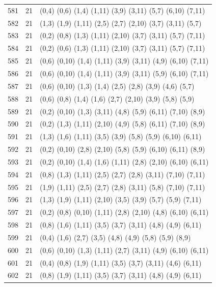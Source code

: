 \begin{appendix}
{\begin{longtable}{lll}
581& 21 & (0,4)   (0,6)  (1,4)  (1,11)  (3,9)   (3,11)  (5,7)   (6,10)  (7,11)\\
582& 21 & (1,3)   (1,9)  (1,11) (2,5)   (2,7)   (2,10)  (3,7)   (3,11)  (5,7)\\
583& 21 & (0,2)   (0,8)  (1,3)  (1,11)  (2,10)  (3,7)   (3,11)  (5,7)   (7,11)\\
584& 21 & (0,2)   (0,6)  (1,3)  (1,11)  (2,10)  (3,7)   (3,11)  (5,7)   (7,11)\\
585& 21 & (0,6)   (0,10) (1,4)  (1,11)  (3,9)   (3,11)  (4,9)   (6,10)  (7,11)\\
586& 21 & (0,6)   (0,10) (1,4)  (1,11)  (3,9)   (3,11)  (5,9)   (6,10)  (7,11)\\
587& 21 & (0,6)   (0,10) (1,3)  (1,4)   (2,5)   (2,8)   (3,9)   (4,6)   (5,7)\\
588& 21 & (0,6)   (0,8)  (1,4)  (1,6)   (2,7)   (2,10)  (3,9)   (5,8)   (5,9)\\
589& 21 & (0,2)   (0,10) (1,3)  (3,11)  (4,8)   (5,9)   (6,11)  (7,10)  (8,9)\\
590& 21 & (0,2)   (1,3)  (1,11) (2,10)  (4,9)   (5,8)   (6,11)  (7,10)  (8,9)\\
591& 21 & (1,3)   (1,6)  (1,11) (3,5)   (3,9)   (5,8)   (5,9)   (6,10)  (6,11)\\
592& 21 & (0,2)   (0,10) (2,8)  (2,10)  (5,8)   (5,9)   (6,10)  (6,11)  (8,9)\\
593& 21 & (0,2)   (0,10) (1,4)  (1,6)   (1,11)  (2,8)   (2,10)  (6,10)  (6,11)\\
594& 21 & (0,8)   (1,3)  (1,11) (2,5)   (2,7)   (2,8)   (3,11)  (7,10)  (7,11)\\
595& 21 & (1,9)   (1,11) (2,5)  (2,7)   (2,8)   (3,11)  (5,8)   (7,10)  (7,11)\\
596& 21 & (1,3)   (1,9)  (1,11) (2,10)  (3,5)   (3,9)   (5,7)   (5,9)   (7,11)\\
597& 21 & (0,2)   (0,8)  (0,10) (1,11)  (2,8)   (2,10)  (4,8)   (6,10)  (6,11)\\
598& 21 & (0,8)   (1,6)  (1,11) (3,5)   (3,7)   (3,11)  (4,8)   (4,9)   (6,11)\\
599& 21 & (0,4)   (1,6)  (2,7)  (3,5)   (4,8)   (4,9)   (5,8)   (5,9)   (8,9)\\
600& 21 & (0,6)   (0,10) (1,3)  (1,11)  (2,7)   (3,11)  (4,9)   (6,10)  (6,11)\\
601& 21 & (0,4)   (0,8)  (1,9)  (1,11)  (3,5)   (3,7)   (3,11)  (4,6)   (6,11)\\
602& 21 & (0,8)   (1,9)  (1,11) (3,5)   (3,7)   (3,11)  (4,8)   (4,9)   (6,11)\\

\end{longtable}}
\end{appendix}
